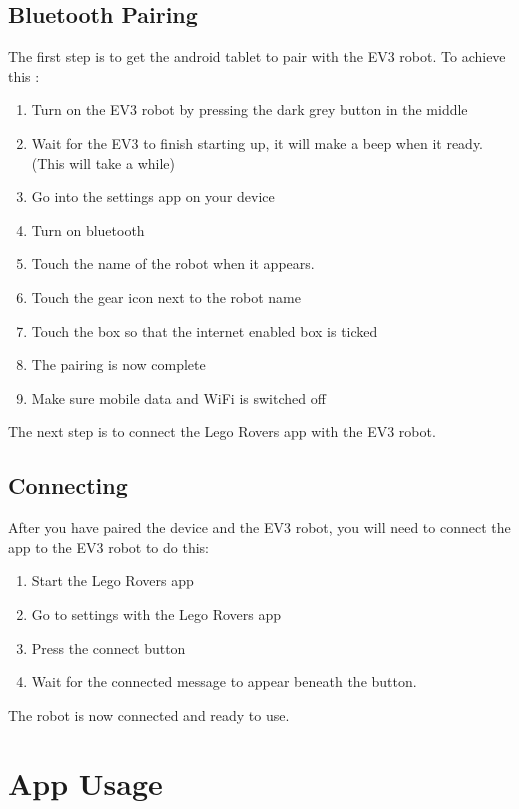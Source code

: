 \documentclass[]{article}   	%
\begin{document}
\subsection{Bluetooth Pairing}
\par{The first step is to get the android tablet to pair with the EV3 robot. To achieve this :
\begin{enumerate}
	\item Turn on the EV3 robot by pressing the dark grey button in the middle
	\item Wait for the EV3 to finish starting up, it will make a beep when it ready. (This will take a while)
	\item Go into the settings app on your device
	\item Turn on bluetooth
	\item Touch the name of the robot when it appears.
	\item Touch the gear icon next to the robot name
	\item Touch the box so that the internet enabled box is ticked
	\item The pairing is now complete
	\item Make sure mobile data and WiFi is switched off
\end{enumerate}
\par{The next step is to connect the Lego Rovers app with the EV3 robot.}

\subsection{Connecting}
\par{After you have paired the device and the EV3 robot, you will need to connect the app to the EV3 robot to do this:
\begin{enumerate}
	\item Start the Lego Rovers app
	\item Go to settings with the Lego Rovers app
	\item Press the connect button
	\item Wait for the connected message to appear beneath the button. 
\end{enumerate}

\par{The robot is now connected and ready to use.}
}



\section{App Usage}
}
\end{document}
